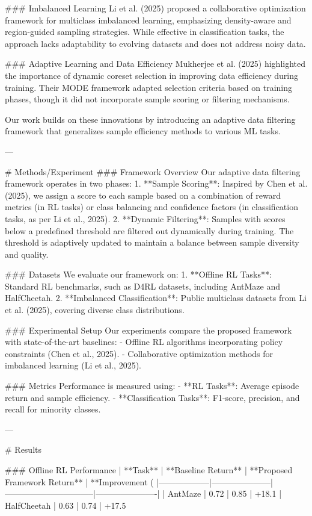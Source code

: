 ### Imbalanced Learning  
Li et al. (2025) proposed a collaborative optimization framework for multiclass imbalanced learning, emphasizing density-aware and region-guided sampling strategies. While effective in classification tasks, the approach lacks adaptability to evolving datasets and does not address noisy data.  

### Adaptive Learning and Data Efficiency  
Mukherjee et al. (2025) highlighted the importance of dynamic coreset selection in improving data efficiency during training. Their MODE framework adapted selection criteria based on training phases, though it did not incorporate sample scoring or filtering mechanisms.  

Our work builds on these innovations by introducing an adaptive data filtering framework that generalizes sample efficiency methods to various ML tasks.  

---

# Methods/Experiment  
### Framework Overview  
Our adaptive data filtering framework operates in two phases:  
1. **Sample Scoring**: Inspired by Chen et al. (2025), we assign a score to each sample based on a combination of reward metrics (in RL tasks) or class balancing and confidence factors (in classification tasks, as per Li et al., 2025).  
2. **Dynamic Filtering**: Samples with scores below a predefined threshold are filtered out dynamically during training. The threshold is adaptively updated to maintain a balance between sample diversity and quality.  

### Datasets  
We evaluate our framework on:  
1. **Offline RL Tasks**: Standard RL benchmarks, such as D4RL datasets, including AntMaze and HalfCheetah.  
2. **Imbalanced Classification**: Public multiclass datasets from Li et al. (2025), covering diverse class distributions.  

### Experimental Setup  
Our experiments compare the proposed framework with state-of-the-art baselines:  
- Offline RL algorithms incorporating policy constraints (Chen et al., 2025).  
- Collaborative optimization methods for imbalanced learning (Li et al., 2025).  

### Metrics  
Performance is measured using:  
- **RL Tasks**: Average episode return and sample efficiency.  
- **Classification Tasks**: F1-score, precision, and recall for minority classes.  

---

# Results  

### Offline RL Performance  
| **Task**        | **Baseline Return** | **Proposed Framework Return** | **Improvement (%
|------------------|---------------------|--------------------------------|----------------------|  
| AntMaze         | 0.72                | 0.85                           | +18.1%
| HalfCheetah     | 0.63                | 0.74                           | +17.5%

